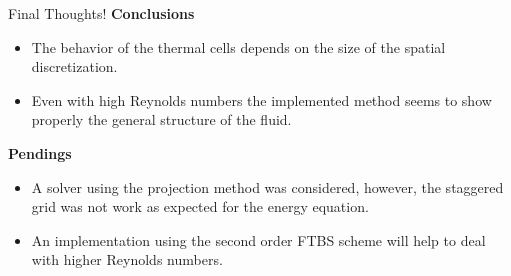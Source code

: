 \documentclass[final]{beamer}
\newlength{\onecolwid}
\begin{document}
\begin{frame}[t]
\begin{columns}[t]
\begin{column}{\onecolwid}
	\vspace{-2em}
\begin{alertblock}{Final Thoughts!}
\textbf{Conclusions}
\begin{itemize}
\item The behavior of the thermal cells depends on the size of the spatial discretization.
\item Even with high Reynolds numbers the implemented method seems to show properly the general structure of the fluid.
\end{itemize}
\textbf{Pendings}
\begin{itemize}
\item A solver using the projection method was considered, however, the staggered grid was not work as expected for the energy equation.
\item An implementation using the second order FTBS scheme will help to deal with higher Reynolds numbers.
\end{itemize}

\end{alertblock}

\end{column} %

\end{columns} %

\end{frame} %
\end{document}
